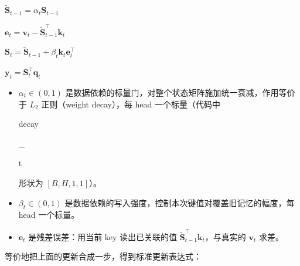 \documentclass[zihao=false,fontset=windows]{ctexart}
\newcommand{\bigmath}[1]{%
  \begin{center}\large$\displaystyle #1$\end{center}%
}
\begin{document}
\bigmath{\widetilde{\mathbf S}_{t-1}=\alpha_t\mathbf S_{t-1}}
\bigmath{\mathbf e_t=\mathbf v_t-\widetilde{\mathbf S}_{t-1}^{\top}\mathbf k_t}
\bigmath{\mathbf S_t=\widetilde{\mathbf S}_{t-1}+\beta_t\mathbf k_t\mathbf e_t^{\top}}
\bigmath{\mathbf y_t=\mathbf S_t^{\top}\mathbf q_t}
\begin{itemize}
\item $\alpha_t\in(0,1)$ 是数据依赖的标量门，对整个状态矩阵施加统一衰减，作用等价于 $L_2$ 正则（weight decay），每 head 一个标量（代码中 {\setlength{\fboxsep}{0pt}\colorbox{inlinebg}{\strut\ttfamily decay}\colorbox{inlinebg}{\strut\ttfamily \_}\allowbreak{}\colorbox{inlinebg}{\strut\ttfamily t}} 形状为 $[B,H,1,1]$）。
\item $\beta_t\in(0,1)$ 是数据依赖的写入强度，控制本次键值对覆盖旧记忆的幅度，每 head 一个标量。
\item $\mathbf e_t$ 是残差误差：用当前 key 读出已关联的值 $\widetilde{\mathbf S}_{t-1}^{\top}\mathbf k_t$，与真实的 $\mathbf v_t$ 求差。
\end{itemize}
等价地把上面的更新合成一步，得到标准更新表达式：
\end{document}

